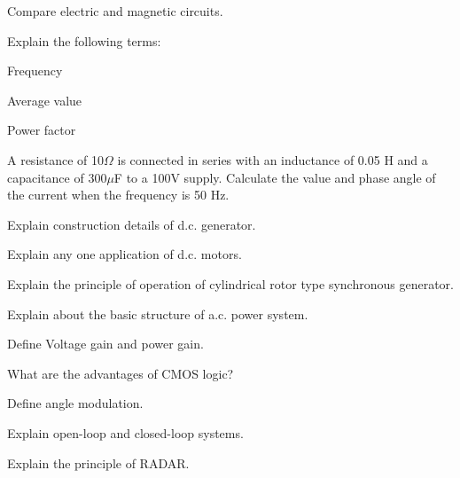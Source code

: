 \item Compare electric and magnetic circuits.  

\ene

\Or


\item \iitem Explain the following terms:

\iitem Frequency \item Average value \item Power factor  

\ene


\item A resistance of 10$\Omega$ is connected in series with an inductance of 0.05 H and a capacitance of 
  300$\mu$F to a 100V supply. Calculate the value and phase angle of the current when the frequency is 50 Hz.  

\ene

\ene

\newpage
\again

\item \iitem \iitem Explain construction details of d.c. generator. 

\item Explain any one application of d.c. motors. 
\ene

\Or
 
\item \iitem Explain the principle of operation of cylindrical rotor type synchronous generator.


\item Explain about the basic structure of a.c. power system.  

\ene
\ene


\ene


\sectionD

\partA


\iitem Define Voltage gain and power gain.  

\item What are the advantages of CMOS logic? \marka

\item Define angle modulation. 

\partBt

\item Explain open-loop and closed-loop systems.


\item Explain the principle of RADAR.

